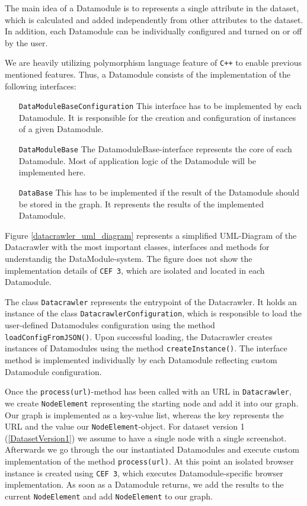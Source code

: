 The main idea of a Datamodule is to represents a single attribute in the dataset, which is calculated and added independently from other attributes to the dataset. In addition, each Datamodule can be individually configured and turned on or off by the user.

 We are heavily utilizing polymorphism language feature of \texttt{C++} to enable previous mentioned features. Thus, a Datamodule consists of the implementation of the following interfaces:

\begin{itemize}
	\item[\texttt{DataModuleBaseConfiguration}] This interface has to be implemented by each Datamodule. It is responsible for the creation and configuration of instances of a given Datamodule.
	\item[\texttt{DataModuleBase}] The DatamoduleBase-interface represents the core of each Datamodule. Most of application logic of the Datamodule will be implemented here.
	\item[\texttt{DataBase}] This has to be implemented if the result of the Datamodule should be stored in the graph. It represents the results of the implemented Datamodule.
\end{itemize}

Figure \ref{datacrawler_uml_diagram} represents a simplified UML-Diagram of the Datacrawler with the most important classes, interfaces and methods for understandig the DataModule-system. The figure does not show the implementation details of \texttt{CEF 3}, which are isolated and located in each Datamodule.

The class \texttt{Datacrawler} represents the entrypoint of the Datacrawler. It holds an instance of the class \texttt{DatacrawlerConfiguration}, which is responsible to load the user-defined Datamodules configuration using the method \texttt{loadConfigFromJSON()}. Upon successful loading, the Datacrawler creates instances of Datamodules using the method \texttt{createInstance()}. The interface method is implemented individually by each Datamodule reflecting custom Datamodule configuration. 

Once the \texttt{process(url)}-method has been called with an URL in \texttt{Datacrawler}, we create \texttt{NodeElement} representing the starting node and add it into our graph. Our graph is implemented as a key-value list, whereas the key represents the URL and the value our \texttt{NodeElement}-object. For dataset version 1 (\ref{DatasetVersion1}) we assume to have a single node with a single screenshot. Afterwards we go through the our instantiated Datamodules and execute custom implementation of the method \texttt{process(url)}. At this point an isolated browser instance is created using \texttt{CEF 3}, which executes Datamodule-specific browser implementation. As soon as a Datamodule returns, we add the results to the current \texttt{NodeElement} and add \texttt{NodeElement} to our graph. 


